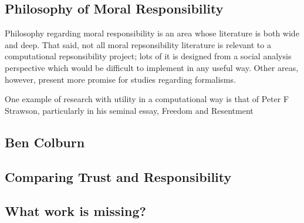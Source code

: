 \subsection{Philosophy of Moral Responsibility}
Philosophy regarding moral responsibility is an area whose literature is both wide and deep. That said, not all moral repsonsibility literature is relevant to a computational repsonsibility project; lots of it is designed from a social analysis perspective which would be difficult to implement in any useful way. Other areas, however, present more promise for studies regarding formalisms.\par

One example of research with utility in a computational way is that of Peter F Strawson, particularly in his seminal essay, Freedom and Resentment~\cite{strawson}
\subsection{Ben Colburn}


\subsection{Comparing Trust and Responsibility}


\subsection{What work is missing?}

